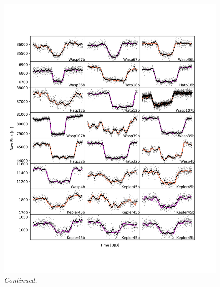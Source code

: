 \begin{subappendices}
  \addtocounter{figure}{-1}
  \begin{figure}
    \includegraphics[width=\textwidth]{RawLighctuves2.pdf}
    \caption{\textit{Continued.}}
  \end{figure}



\end{subappendices}
